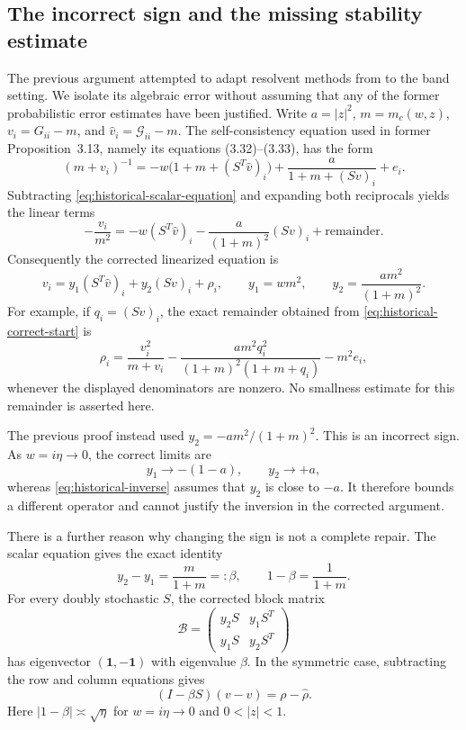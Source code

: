 \documentclass[11pt,reqno]{amsart}
\numberwithin{equation}{section}
\theoremstyle{plain}
\theoremstyle{definition}
\theoremstyle{remark}
\begin{document}
\subsection{The incorrect sign and the missing stability estimate}
\label{subsec:historical-proof-error}

The previous argument attempted to adapt resolvent methods from
\cite{MR3068390,MR3230002} to the band setting. We isolate its algebraic
error without assuming that any of the former
probabilistic error estimates have been justified.  Write
\(a=|z|^2\), \(m=m_c(w,z)\),
\(v_i=G_{ii}-m\), and \(\widehat v_i=\mathcal G_{ii}-m\).
The self-consistency equation used in former Proposition~3.13, namely
its equations (3.32)--(3.33), has the form
\begin{equation}
 (m+v_i)^{-1}
 =-w\bigl(1+m+(S^T\widehat v)_i\bigr)
  +\frac a{1+m+(Sv)_i}+e_i.
 \label{eq:historical-correct-start}
\end{equation}
Subtracting \eqref{eq:historical-scalar-equation} and expanding both
reciprocals yields the linear terms
\[
 -\frac{v_i}{m^2}
 =-w(S^T\widehat v)_i-
   \frac a{(1+m)^2}(Sv)_i+\text{remainder}.
\]
Consequently the corrected linearized equation is
\begin{equation}
 v_i=y_1(S^T\widehat v)_i+y_2(Sv)_i+\rho_i,
 \qquad
 y_1=wm^2,\qquad y_2=\frac{am^2}{(1+m)^2}.
 \label{eq:historical-correct-linearization}
\end{equation}
For example, if \(q_i=(Sv)_i\), the exact remainder obtained from
\eqref{eq:historical-correct-start} is
\[
 \rho_i=
 \frac{v_i^2}{m+v_i}
 -\frac{am^2q_i^2}{(1+m)^2(1+m+q_i)}-m^2e_i,
\]
whenever the displayed denominators are nonzero.  No smallness estimate
for this remainder is asserted here.

The previous proof instead used
\(y_2=-am^2/(1+m)^2\).  This is an incorrect sign.  As
\(w=i\eta\to0\), the correct limits are
\begin{equation}
 y_1\longrightarrow-(1-a),\qquad y_2\longrightarrow+a,
 \label{eq:historical-correct-limits}
\end{equation}
whereas \eqref{eq:historical-inverse} assumes that \(y_2\) is close
to \(-a\).  It therefore bounds a different operator and cannot
justify the inversion in the corrected argument.

There is a further reason why changing the sign is not a complete
repair.  The scalar equation gives the exact identity
\begin{equation}
 y_2-y_1=\frac m{1+m}=: \beta,
 \qquad 1-\beta=\frac1{1+m}.
 \label{eq:historical-beta}
\end{equation}
For every doubly stochastic \(S\), the corrected block matrix
\[
 \mathcal B=
 \begin{pmatrix}y_2S&y_1S^T\\y_1S&y_2S^T\end{pmatrix}
\]
has eigenvector \((\mathbf1,-\mathbf1)\) with eigenvalue \(\beta\).
In the symmetric case, subtracting the row and column equations gives
\begin{equation}
 (I-\beta S)(v-\widehat v)=\rho-\widehat\rho.
 \label{eq:historical-difference-channel}
\end{equation}
Here \(|1-\beta|\asymp\sqrt\eta\) for
\(w=i\eta\to0\) and \(0<|z|<1\).
\end{document}
